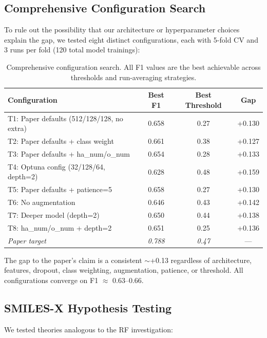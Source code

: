 \documentclass[11pt,a4paper]{article}
\begin{document}
\subsection{Comprehensive Configuration Search}
\label{sec:comprehensive}

To rule out the possibility that our architecture or hyperparameter choices explain the gap, we tested eight distinct configurations, each with 5-fold CV and 3 runs per fold (120 total model trainings):

\begin{table}[H]
\centering
\caption{Comprehensive configuration search. All F1 values are the best achievable across thresholds and run-averaging strategies.}
\label{tab:configs}
\begin{tabular}{p{7.5cm}ccc}
\toprule
Configuration & Best F1 & Best Threshold & Gap \\
\midrule
T1: Paper defaults (512/128/128, no extra) & 0.658 & 0.27 & +0.130 \\
T2: Paper defaults + class weight & 0.661 & 0.38 & +0.127 \\
T3: Paper defaults + ha\_num/o\_num & 0.654 & 0.28 & +0.133 \\
T4: Optuna config (32/128/64, depth=2) & 0.628 & 0.48 & +0.159 \\
T5: Paper defaults + patience=5 & 0.658 & 0.27 & +0.130 \\
T6: No augmentation & 0.646 & 0.43 & +0.142 \\
T7: Deeper model (depth=2) & 0.650 & 0.44 & +0.138 \\
T8: ha\_num/o\_num + depth=2 & 0.651 & 0.25 & +0.136 \\
\midrule
\textit{Paper target} & \textit{0.788} & \textit{0.47} & --- \\
\bottomrule
\end{tabular}
\end{table}

The gap to the paper's claim is a consistent $\sim$+0.13 regardless of architecture, features, dropout, class weighting, augmentation, patience, or threshold. All configurations converge on F1 $\approx$ 0.63--0.66.

\subsection{SMILES-X Hypothesis Testing}

We tested theories analogous to the RF investigation:
\end{document}
